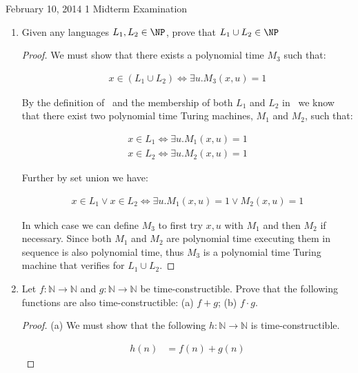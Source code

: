 \documentclass[usletter]{article}
\begin{document}
           {February 10, 2014}
           {1}
           {Midterm Examination}

\begin{enumerate}
  \item Given any languages $L_1, L_2 \in \NP$, prove that $L_1 \cup L_2 \in \NP$
    \begin{proof}
      We must show that there exists a polynomial time $M_3$ such that:

      \begin{align}
        x \in (L_1 \cup L_2) \iff \exists u.M_3(x,u) = 1
      \end{align}

      By the definition of \NP\ and the membership of both $L_1$ and $L_2$ in \NP\  we know that there exist two polynomial time Turing machines, $M_1$ and $M_2$, such that:

      \begin{align}
        x \in L_1 \iff \exists u.M_1(x,u) = 1 \\
        x \in L_2 \iff \exists u.M_2(x,u) = 1
      \end{align}

      Further by set union we have:

      \begin{align}
        x \in L_1 \lor x \in L_2 \iff \exists u.M_1(x,u) = 1 \lor  M_2(x,u) = 1
      \end{align}

      In which case we can define $M_3$ to first try $x,u$ with $M_1$ and then $M_2$ if necessary. Since both $M_1$ and $M_2$ are polynomial time executing them in sequence is also polynomial time, thus $M_3$ is a polynomial time Turing machine that verifies for $L_1 \cup L_2$.
    \end{proof}

  \item Let $f : \mathbb{N} \rightarrow \mathbb{N}$ and $g : \mathbb{N} \rightarrow \mathbb{N}$ be time-constructible. Prove that the following functions are also time-constructible: (a) $f + g$; (b) $f \cdot g$.


    \begin{proof} (a)
      We must show that the following $h : \mathbb{N} \rightarrow \mathbb{N}$ is time-constructible.

      \begin{align*}
        h(n) &= f(n) + g(n)
      \end{align*}


\end{proof}
\end{enumerate}
\end{document}
